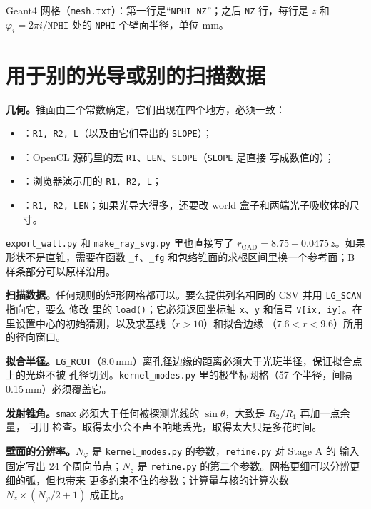 \documentclass[11pt,a4paper,fontset=fandol]{ctexart}
\newcommand{\code}[1]{\texttt{#1}}
\begin{document}
Geant4 网格（\code{mesh.txt}）：第一行是“\code{NPHI NZ}”；之后 \code{NZ} 行，每行是 $z$ 和
$\varphi_i=2\pi i/\code{NPHI}$ 处的 \code{NPHI} 个壁面半径，单位 mm。

\section{用于别的光导或别的扫描数据}
\label{sec:adapt}

\textbf{几何。}锥面由三个常数确定，它们出现在四个地方，必须一致：
\begin{itemize}
\item {}：\code{R1, R2, L}（以及由它们导出的 \code{SLOPE}）；
\item {}：OpenCL 源码里的宏 \code{R1}、\code{LEN}、\code{SLOPE}（\code{SLOPE} 是直接
写成数值的）；
\item {}：浏览器演示用的 \code{R1, R2, L}；
\item {}：\code{R1, R2, LEN}；如果光导大得多，还要改 world 盒子和两端光子吸收体的尺寸。
\end{itemize}
\code{export\_wall.py} 和 \code{make\_ray\_svg.py} 里也直接写了 $r_\mathrm{CAD}=8.75-0.0475\,z$。如果
形状不是直锥，需要在函数 \code{\_f}、\code{\_fg} 和包络锥面的求根区间里换一个参考面；B 样条部分可以原样沿用。

\textbf{扫描数据。}任何规则的矩形网格都可以。要么提供列名相同的 CSV 并用 \code{LG\_SCAN} 指向它，要么
修改  里的 \code{load()}；它必须返回坐标轴 \code{x}、\code{y} 和信号
\code{V[ix, iy]}。在  里设置中心的初始猜测，以及求基线（$r>10$）和拟合边缘
（$7.6<r<9.6$）所用的径向窗口。

\textbf{拟合半径。}\code{LG\_RCUT}（8.0\,mm）离孔径边缘的距离必须大于光斑半径，保证拟合点上的光斑不被
孔径切到。\code{kernel\_modes.py} 里的极坐标网格（57 个半径，间隔 0.15\,mm）必须覆盖它。

\textbf{发射锥角。}\code{smax} 必须大于任何被探测光线的 $\sin\theta$，大致是 $R_2/R_1$ 再加一点余量，
可用  检查。取得太小会不声不响地丢光，取得太大只是多花时间。

\textbf{壁面的分辨率。}$N_\varphi$ 是 \code{kernel\_modes.py} 的参数，\code{refine.py} 对 Stage A 的
输入固定写出 24 个周向节点；$N_z$ 是 \code{refine.py} 的第二个参数。网格更细可以分辨更细的弧，但也带来
更多约束不住的参数；计算量与核的计算次数 $N_z\times(N_\varphi/2+1)$ 成正比。
\end{document}
